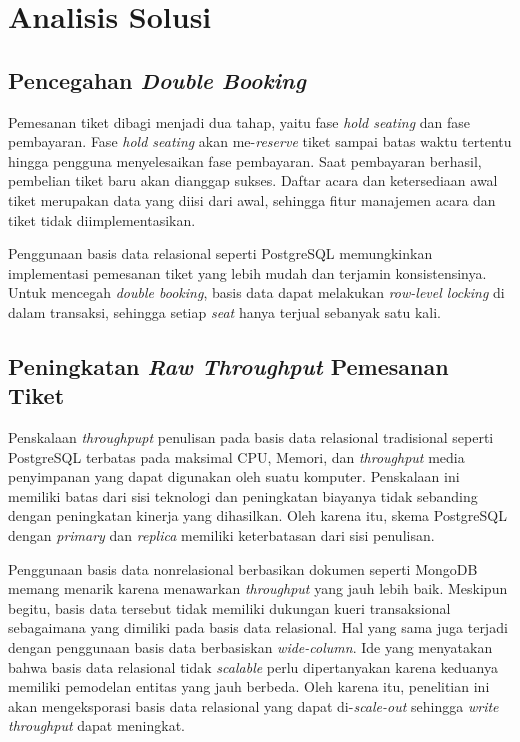 \section{Analisis Solusi}

\subsection{Pencegahan \textit{Double Booking}}

Pemesanan tiket dibagi menjadi dua tahap, yaitu fase \textit{hold seating} dan fase pembayaran. Fase \textit{hold seating} akan me-\textit{reserve} tiket sampai batas waktu tertentu hingga pengguna menyelesaikan fase pembayaran. Saat pembayaran berhasil, pembelian tiket baru akan dianggap sukses. Daftar acara dan ketersediaan awal tiket merupakan data yang diisi dari awal, sehingga fitur manajemen acara dan tiket tidak diimplementasikan.

Penggunaan basis data relasional seperti PostgreSQL memungkinkan implementasi pemesanan tiket yang lebih mudah dan terjamin konsistensinya. Untuk mencegah \textit{double booking}, basis data dapat melakukan \textit{row-level locking} di dalam transaksi, sehingga setiap \textit{seat} hanya terjual sebanyak satu kali.

\subsection{Peningkatan \textit{Raw Throughput} Pemesanan Tiket}

Penskalaan \textit{throughpupt} penulisan pada basis data relasional tradisional seperti PostgreSQL terbatas pada maksimal CPU, Memori, dan \textit{throughput} media penyimpanan yang dapat digunakan oleh suatu komputer. Penskalaan ini memiliki batas dari sisi teknologi dan peningkatan biayanya tidak sebanding dengan peningkatan kinerja yang dihasilkan. Oleh karena itu, skema PostgreSQL dengan \textit{primary} dan \textit{replica} memiliki keterbatasan dari sisi penulisan.

Penggunaan basis data nonrelasional berbasikan dokumen seperti MongoDB memang menarik karena menawarkan \textit{throughput} yang jauh lebih baik. Meskipun begitu, basis data tersebut tidak memiliki dukungan kueri transaksional sebagaimana yang dimiliki pada basis data relasional. Hal yang sama juga terjadi dengan penggunaan basis data berbasiskan \textit{wide-column}. Ide yang menyatakan bahwa basis data relasional tidak \textit{scalable} perlu dipertanyakan karena keduanya memiliki pemodelan entitas yang jauh berbeda. Oleh karena itu, penelitian ini akan mengeksporasi basis data relasional yang dapat di-\textit{scale-out} sehingga \textit{write throughput} dapat meningkat.

